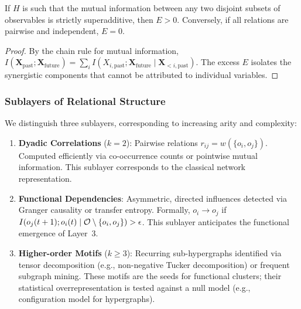 \begin{proposition}
\label{prop:excess_entropy}
If $H$ is such that the mutual information between any two disjoint subsets of observables is strictly superadditive, then $E > 0$. Conversely, if all relations are pairwise and independent, $E = 0$.
\end{proposition}
\begin{proof}
By the chain rule for mutual information, $I(\mathbf{X}_{\text{past}}; \mathbf{X}_{\text{future}}) = \sum_i I(X_{i,\text{past}}; \mathbf{X}_{\text{future}} \mid \mathbf{X}_{<i,\text{past}})$. The excess $E$ isolates the synergistic components that cannot be attributed to individual variables.
\end{proof}

\subsubsection{Sublayers of Relational Structure}
We distinguish three sublayers, corresponding to increasing arity and complexity:
\begin{enumerate}
    \item \textbf{Dyadic Correlations} ($k=2$): Pairwise relations $r_{ij} = w(\{o_i, o_j\})$. Computed efficiently via co-occurrence counts or pointwise mutual information. This sublayer corresponds to the classical network representation.
    \item \textbf{Functional Dependencies}: Asymmetric, directed influences detected via Granger causality or transfer entropy. Formally, $o_i \rightarrow o_j$ if $I(o_j(t+1); o_i(t) \mid \mathcal{O} \setminus \{o_i, o_j\}) > \epsilon$. This sublayer anticipates the functional emergence of Layer~3.
    \item \textbf{Higher-order Motifs} ($k \ge 3$): Recurring sub-hypergraphs identified via tensor decomposition (e.g., non-negative Tucker decomposition) or frequent subgraph mining. These motifs are the seeds for functional clusters; their statistical overrepresentation is tested against a null model (e.g., configuration model for hypergraphs).
\end{enumerate}

